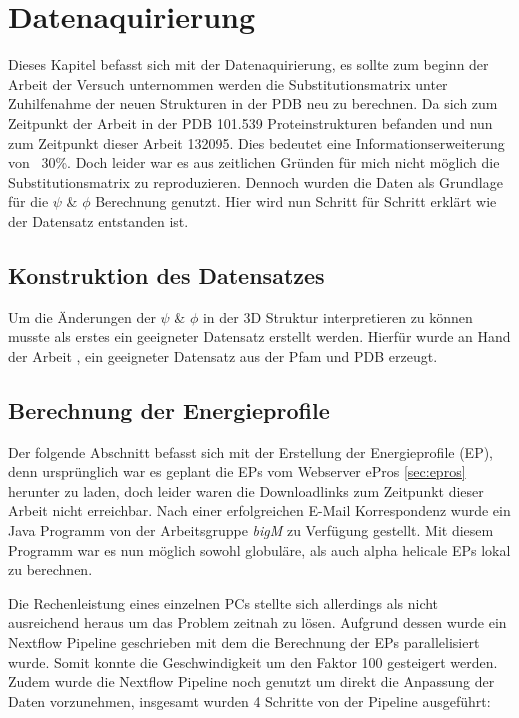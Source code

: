 \chapter[Datenaquirierung]{Datenaquirierung}
\label{chap:Datenaquirierung}

Dieses Kapitel befasst sich mit der Datenaquirierung, es sollte zum beginn der Arbeit der Versuch unternommen werden die Substitutionsmatrix unter Zuhilfenahme der neuen Strukturen in der PDB neu zu berechnen. Da sich zum Zeitpunkt der Arbeit \cite{Mathias.2014} in der PDB 101.539 Proteinstrukturen befanden und nun zum Zeitpunkt dieser Arbeit 132095. Dies bedeutet eine Informationserweiterung von ~30\%. Doch leider war es aus zeitlichen Gründen für mich nicht möglich die Substitutionsmatrix zu reproduzieren. Dennoch wurden die Daten als Grundlage für die $\psi$ \& $\phi$ Berechnung genutzt. Hier wird nun Schritt für Schritt erklärt wie der Datensatz entstanden ist.

\section{Konstruktion des Datensatzes}

Um die Änderungen der $\psi$ \& $\phi$ in der 3D Struktur interpretieren zu können musste als erstes ein geeigneter Datensatz erstellt werden. Hierfür wurde an Hand der Arbeit \cite{Mathias.2014}, ein geeigneter Datensatz aus der Pfam und PDB erzeugt. 






\section{Berechnung der Energieprofile}
Der folgende Abschnitt befasst sich mit der Erstellung der Energieprofile (EP), denn ursprünglich war es geplant die EPs vom Webserver ePros \ref{sec:epros} herunter zu laden, doch leider waren die Downloadlinks zum Zeitpunkt dieser Arbeit nicht erreichbar. Nach einer erfolgreichen E-Mail Korrespondenz wurde ein Java Programm von der Arbeitsgruppe \emph{bigM} zu Verfügung gestellt. Mit diesem Programm war es nun möglich sowohl globuläre, als auch alpha helicale EPs lokal zu berechnen. 

Die Rechenleistung eines einzelnen PCs stellte sich allerdings als nicht ausreichend heraus um das Problem zeitnah zu lösen. Aufgrund dessen wurde ein Nextflow Pipeline geschrieben mit dem die Berechnung der EPs parallelisiert wurde. Somit konnte die Geschwindigkeit um den Faktor 100 gesteigert werden. Zudem wurde die Nextflow Pipeline noch genutzt um direkt die Anpassung der Daten vorzunehmen, insgesamt wurden 4 Schritte von der Pipeline ausgeführt:

